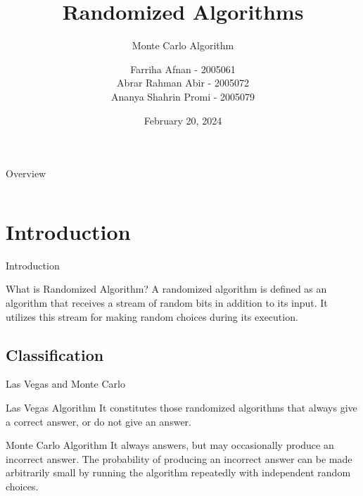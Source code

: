 \documentclass{beamer}
\title{Randomized Algorithms}
\subtitle{Monte Carlo Algorithm}
\author {
    Farriha Afnan - 2005061\\
    Abrar Rahman Abir - 2005072\\
    Ananya Shahrin Promi - 2005079\\
}
\institute{Department of CSE,\\ Bangladesh University of Engineering and Technology}
\date{February 20, 2024}
\begin{document}
    \nocite{MITOCWCourse}
    \nocite{MC}
    \nocite{MCS}

    \begin{frame}
        \titlepage
    \end{frame}
    
    \begin{frame}{Overview}
        \begin{columns}[t]
            \begin{column}{.2\textwidth}
            \end{column}
            \begin{column}{.8\textwidth}
                \tableofcontents
            \end{column}
        \end{columns}
    \end{frame}

    \section{Introduction}
    \begin{frame}{Introduction}
        \begin{block}{What is Randomized Algorithm?}
            A randomized algorithm is defined as an algorithm that receives a stream of random bits in addition to its input. It utilizes this stream for making random choices during its execution.
        \end{block}
    \end{frame}

    \subsection{Classification}
    \begin{frame}{Las Vegas and Monte Carlo}
        \begin{block}{Las Vegas Algorithm}
            It constitutes those randomized algorithms that always give a correct answer, or do not give an answer.
        \end{block}
        \begin{block}{Monte Carlo Algorithm}
            It always answers, but may occasionally produce an incorrect answer. The probability of producing an incorrect answer can be made arbitrarily small by running the algorithm repeatedly with independent random choices.
        \end{block}
    \end{frame}
\end{document}
